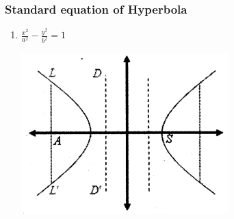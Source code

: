 \documentclass[12pt]{article}
\begin{document}
\begin{multicols}{2}
\subsubsection*{Standard equation of Hyperbola}

\begin{enumerate}
    \item $\frac{x^{2}}{a^{2}}-\frac{y^{2}}{b^{2}}=1$ \begin{center}
        \includegraphics[scale=0.8]{7.png}
    \end{center}
    \begin{itemize}


\end{itemize}
\end{enumerate}
\end{multicols}
\end{document}
